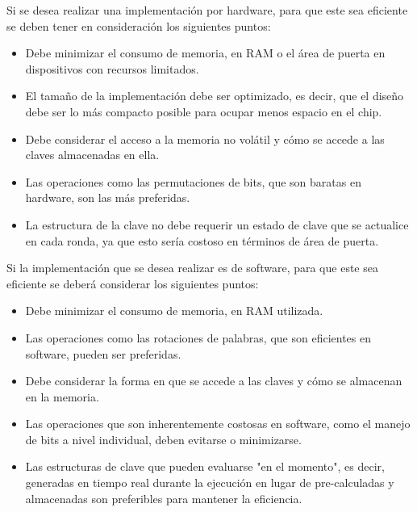 \documentclass[a4paper,10pt]{article}
\begin{document}
	Si se desea realizar una implementación por hardware, para que este sea eficiente se deben tener en consideración los siguientes puntos:
	\begin{itemize}
		\item Debe minimizar el consumo de memoria, en RAM o el área de puerta en dispositivos con recursos limitados.
		\item El tamaño de la implementación debe ser optimizado, es decir, que el diseño debe ser lo más compacto posible para ocupar menos espacio en el chip.
		\item Debe considerar el acceso a la memoria no volátil y cómo se accede a las claves almacenadas en ella.
		\item Las operaciones como las permutaciones de bits, que son baratas en hardware, son las más preferidas.
		\item La estructura de la clave no debe requerir un estado de clave que se actualice en cada ronda, ya que esto sería costoso en términos de área de puerta.
	\end{itemize}
	Si la implementación que se desea realizar es de software, para que este sea eficiente se deberá considerar los siguientes puntos:
	\begin{itemize}
		\item Debe minimizar el consumo de memoria, en RAM utilizada.
		\item Las operaciones como las rotaciones de palabras, que son eficientes en software, pueden ser preferidas.
		\item Debe considerar la forma en que se accede a las claves y cómo se almacenan en la memoria.
		\item Las operaciones que son inherentemente costosas en software, como el manejo de bits a nivel individual, deben evitarse o minimizarse.
		\item Las estructuras de clave que pueden evaluarse "en el momento", es decir, generadas en tiempo real durante la ejecución en lugar de pre-calculadas y almacenadas son preferibles para mantener la eficiencia.
	\end{itemize}
\end{document}

